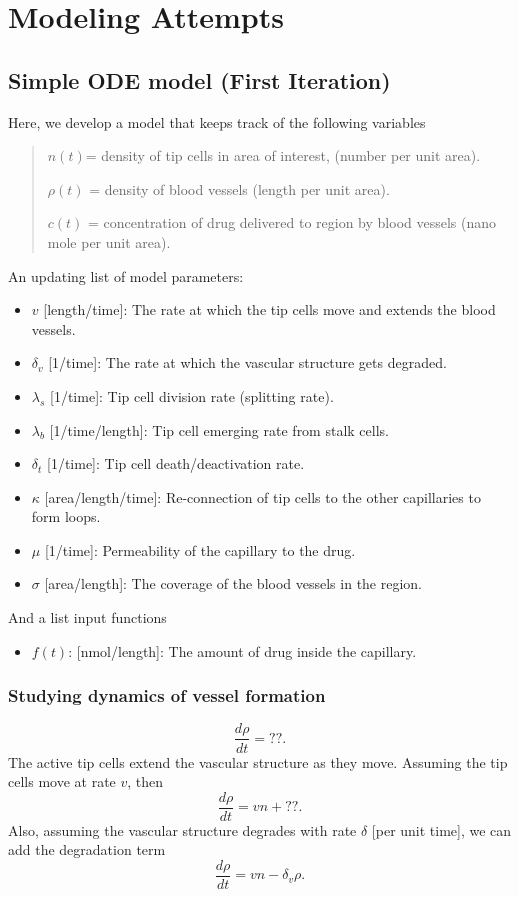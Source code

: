 \chapter{Modeling Attempts}

\section{Simple ODE model (First Iteration)}
Here, we develop a model that keeps track of the following variables
\begin{quote}
	$n(t)$= density of tip cells in area of interest, (number per unit area).
	
	$\rho(t)$ = density of blood vessels (length per unit area).
	
	$c(t)$ = concentration of drug delivered to region by blood vessels (nano mole per unit area).
\end{quote}
An updating list of model parameters:
\begin{itemize}
	\item $v$ [length/time]: The rate at which the tip cells move and extends the blood vessels.
	\item $\delta_v$ [1/time]: The rate at which the vascular structure gets degraded.
	\item $\lambda_s$ [1/time]: Tip cell division rate (splitting rate).
	\item $\lambda_b$ [1/time/length]: Tip cell emerging rate from stalk cells.
	\item $\delta_t$ [1/time]: Tip cell death/deactivation rate.
	\item $\kappa$ [area/length/time]: Re-connection of tip cells to the other capillaries to form loops.  
	\item $\mu$ [1/time]: Permeability of the capillary to the drug. 
	\item $\sigma$ [area/length]: The coverage of the blood vessels in the region.
\end{itemize}
And a list input functions
\begin{itemize}
	\item $f(t)$: [nmol/length]: The amount of drug inside the capillary.
\end{itemize}




\subsection*{Studying dynamics of vessel formation}
\[ \frac{d\rho}{dt} = ??. \]
The active tip cells extend the vascular structure as they move. Assuming the tip cells move at rate $v$, then 
\[ \frac{d \rho}{dt} = vn+ ??. \]
Also, assuming the vascular structure degrades with rate $\delta$ [per unit time], we can add the degradation term 
\[ \boxed{\frac{d\rho}{dt} = vn - \delta_v \rho} . \]



